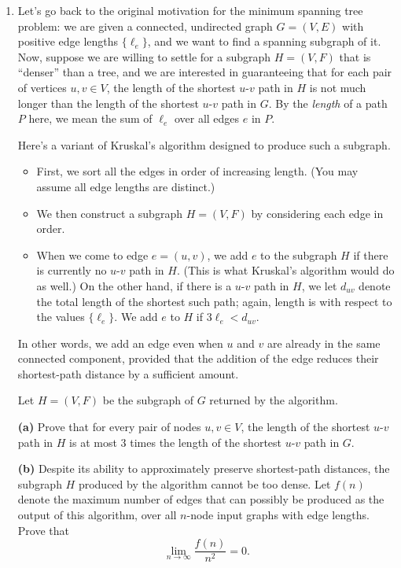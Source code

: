 \documentclass[12pt]{article}
\begin{document}
\begin{enumerate}
{}


\item

Let's go back to the original motivation for the minimum spanning
tree problem: we are given a connected, undirected graph
$G = (V,E)$ with positive edge lengths $\{\ell_e\}$, and we want
to find a spanning subgraph of it.
Now, suppose we are willing to settle for a subgraph $H = (V,F)$
that is ``denser'' than a tree, and we are interested
in guaranteeing that for each pair of vertices $u, v \in V$,
the length of the shortest $u$-$v$ path in $H$
is not much longer than the length of the shortest
$u$-$v$ path in $G$.
By the {\em length} of a path $P$ here,
we mean the sum of $\ell_e$ over all edges $e$ in $P$.

Here's a variant of Kruskal's algorithm designed to produce such a subgraph.
\begin{itemize}
\item First, we sort all the edges in order of increasing length.
(You may assume all edge lengths are distinct.)
\item We then construct a subgraph $H = (V,F)$ by
considering each edge in order.
\item When we come to edge $e = (u,v)$,
we add $e$ to the subgraph $H$ if there is currently
no $u$-$v$ path in $H$.
(This is what Kruskal's algorithm would do as well.)
On the other hand, if there is a $u$-$v$ path in $H$,
we let $d_{uv}$ denote the total length of the shortest such path;
again, length is with respect to the values $\{\ell_e\}$.
We add $e$ to $H$ if $3 \ell_e < d_{uv}$.
\end{itemize}
In other words, we add an edge even when $u$ and $v$ are
already in the same connected component, provided that
the addition of the edge reduces their shortest-path distance
by a sufficient amount.

Let $H = (V,F)$ be the subgraph of $G$ returned by the algorithm.

\medskip
{\bf (a)} Prove that for every pair of nodes $u, v \in V$,
the length of the shortest $u$-$v$ path in $H$
is at most $3$ times the length of the
shortest $u$-$v$ path in $G$.

\medskip
{\bf (b)\Star} Despite its ability to approximately preserve
shortest-path distances, the subgraph $H$ produced
by the algorithm cannot be too dense.
Let $f(n)$ denote the maximum number of edges
that can possibly be produced as the output of this algorithm,
over all $n$-node input graphs with edge lengths.
Prove that $$\lim_{n \rightarrow \infty} \frac{f(n)}{n^2} = 0.$$


\end{enumerate}
\end{document}
